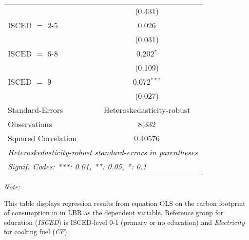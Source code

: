 \begin{table}[htbp!]
\begin{adjustbox}{width = 1\textwidth, max height = 0.95\textheight, center}
\begin{threeparttable}[b]
\begin{tabular}{lc}
                                & (0.431)\\   
            ISCED $=$ 2-5       & 0.026\\   
                                & (0.031)\\   
            ISCED $=$ 6-8       & 0.202$^{*}$\\   
                                & (0.109)\\   
            ISCED $=$ 9         & 0.072$^{***}$\\   
                                & (0.027)\\   
            \midrule 
            Standard-Errors     & Heteroskedasticity-robust \\   
            Observations        & 8,332\\  
            Squared Correlation & 0.40576\\  
            \midrule \midrule
            \multicolumn{2}{l}{\emph{Heteroskedasticity-robust standard-errors in parentheses}}\\
            \multicolumn{2}{l}{\emph{Signif. Codes: ***: 0.01, **: 0.05, *: 0.1}}\\
         \end{tabular}
         
         \begin{tablenotes}\item \medskip \textit{Note:}
            \item This table displays regression results from equation OLS on the carbon footprint of consumption in  in LBR as the dependent variable.  Reference group for education (\textit{ISCED}) is ISCED-level 0-1 (primary or no education) and \textit{Electricity} for cooking fuel (\textit{CF}).
         \end{tablenotes}
      \end{threeparttable}
   \end{adjustbox}
\end{table}


